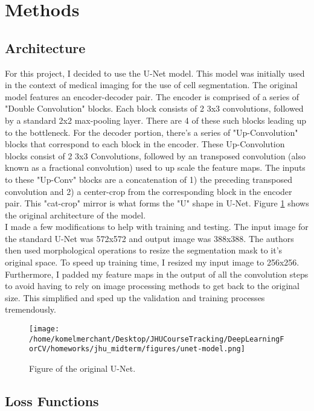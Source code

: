 \documentclass[Location Location Location! : Exploring Image Segmentation Problem In Urban Driving Scenarios]{IEEEtran}
\begin{document}
\section{Methods}

\subsection{Architecture}
For this project, I decided to use the U-Net model. This model was initially used in the context of medical imaging for the use of cell segmentation. The original model features an encoder-decoder pair. The encoder is comprised of a series of "Double Convolution" blocks. Each block consists of 2 3x3 convolutions, followed by a standard 2x2 max-pooling layer. There are 4 of these such blocks leading up to the bottleneck. For the decoder portion, there's a series of "Up-Convolution" blocks that correspond to each block in the encoder. These Up-Convolution blocks consist of 2 3x3 Convolutions, followed by an transposed convolution (also known as a fractional convolution) used to up scale the feature maps. The inputs to these "Up-Conv" blocks are a concatenation of 1) the preceding transposed convolution and 2) a center-crop from the corresponding block in the encoder pair. This "cat-crop" mirror is what forms the "U" shape in U-Net. Figure \ref{unet} shows the original architecture of the model. \\  

I made a few modifications to help with training and testing. The input image for the standard U-Net was 572x572 and output image was 388x388. The authors \cite{unet} then used morphological operations to resize the segmentation mask to it's original space. To speed up training time, I resized my input image to 256x256. Furthermore, I padded my feature maps in the output of all the convolution steps to avoid having to rely on image processing methods to get back to the original size. This simplified and sped up the validation and training processes tremendously. 


\begin{figure}[htbp]
\centerline{\texttt{[image: /home/komelmerchant/Desktop/JHUCourseTracking/DeepLearningForCV/homeworks/jhu\_midterm/figures/unet-model.png]}}
\caption{Figure of the original U-Net.}
\label{unet}
\end{figure}


\subsection{Loss Functions}
\end{document}
